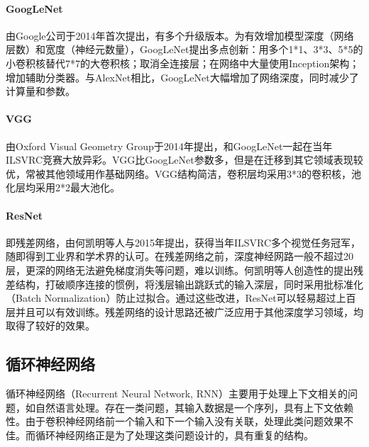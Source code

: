 \paragraph{GoogLeNet}\cite{szegedy2015going}由Google公司于2014年首次提出，有多个升级版本。为有效增加模型深度（网络层数）和宽度（神经元数量），GoogLeNet提出多点创新：用多个1*1、3*3、5*5的小卷积核替代7*7的大卷积核；取消全连接层；在网络中大量使用Inception架构；增加辅助分类器。与AlexNet相比，GoogLeNet大幅增加了网络深度，同时减少了计算量和参数。

\paragraph{VGG}\cite{simonyan2014very}由Oxford Visual Geometry Group于2014年提出，和GoogLeNet一起在当年ILSVRC竞赛大放异彩。VGG比GoogLeNet参数多，但是在迁移到其它领域表现较优，常被其他领域用作基础网络。VGG结构简洁，卷积层均采用3*3的卷积核，池化层均采用2*2最大池化。

\paragraph{ResNet}\cite{he2016deep}即残差网络，由何凯明等人与2015年提出，获得当年ILSVRC多个视觉任务冠军，随即得到工业界和学术界的认可。在残差网络之前，深度神经网路一般不超过20层，更深的网络无法避免梯度消失等问题，难以训练。何凯明等人创造性的提出残差结构，打破顺序连接的惯例，将浅层输出跳跃式的输入深层，同时采用批标准化（Batch Normalization）\cite{ioffe2015batch}防止过拟合。通过这些改进，ResNet可以轻易超过上百层并且可以有效训练。残差网络的设计思路还被广泛应用于其他深度学习领域，均取得了较好的效果。

\subsection{循环神经网络}
循环神经网络（Recurrent Neural Network, RNN）主要用于处理上下文相关的问题，如自然语言处理。存在一类问题，其输入数据是一个序列，具有上下文依赖性。由于卷积神经网络前一个输入和下一个输入没有关联，处理此类问题效果不佳。而循环神经网络正是为了处理这类问题设计的，具有重复的结构。